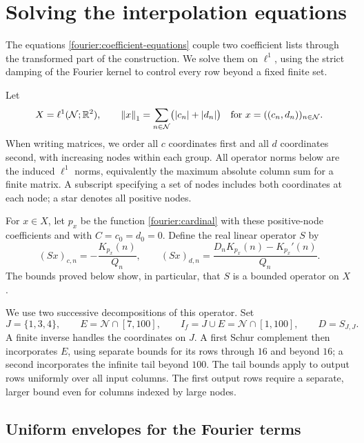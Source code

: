 \section{Solving the interpolation equations}\label{sec:interpolation}

The equations \eqref{fourier:coefficient-equations} couple two coefficient
lists through the transformed part of the construction.  We solve them on
$\ell^1$, using the strict damping of the Fourier kernel to control every
row beyond a fixed finite set.

Let
\[
 X=\ell^1(\mathcal N;\mathbb R^2),\qquad
 \left\lVert x\right\rVert_1=\sum_{n\in\mathcal N}\bigl(\left\lvert c_n\right\rvert+\left\lvert d_n\right\rvert\bigr)
 \quad\text{for }x=((c_n,d_n))_{n\in\mathcal N}.
\]
When writing matrices, we order all $c$ coordinates first and all $d$
coordinates second, with increasing nodes within each group.  All operator
norms below are the induced $\ell^1$ norms, equivalently the maximum
absolute column sum for a finite matrix.  A subscript specifying a set of
nodes includes both coordinates at each node; a star denotes all positive
nodes.

For $x\in X$, let $p_x$ be the function \eqref{fourier:cardinal} with these
positive-node coefficients and with $C=c_0=d_0=0$.  Define the real linear
operator $S$ by
\begin{equation}\label{interpolation:S}
 (Sx)_{c,n}=-\frac{K_{p_x}(n)}{Q_n},\qquad
 (Sx)_{d,n}=\frac{D_nK_{p_x}(n)-K_{p_x}'(n)}{Q_n}.
\end{equation}
The bounds proved below show, in particular, that $S$ is a bounded operator
on $X$.

We use two successive decompositions of this operator. Set
\begin{equation}\label{interpolation:node-blocks}
 J=\{1,3,4\},\qquad E=\mathcal N\cap[7,100],\qquad
 I_f=J\cup E=\mathcal N\cap[1,100],\qquad D=S_{J,J}.
\end{equation}
A finite inverse handles the coordinates on $J$. A first Schur complement
then incorporates $E$, using separate bounds for its rows through $16$
and beyond $16$; a second incorporates the infinite tail beyond $100$.
The tail bounds apply to output rows uniformly over all input columns.
The first output rows require a separate, larger bound even for columns
indexed by large nodes.

\subsection{Uniform envelopes for the Fourier terms}

